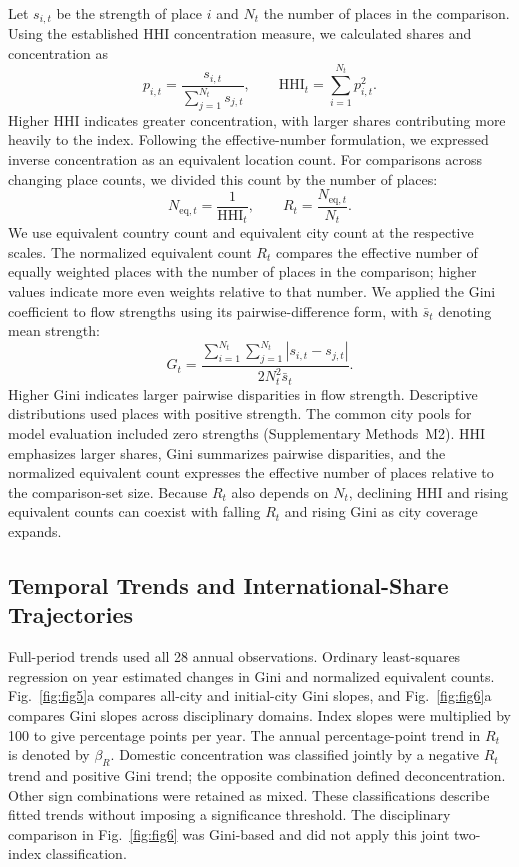 Let $s_{i,t}$ be the strength of place $i$ and $N_t$ the number of places in the comparison. Using the established HHI concentration measure\cite{rhoades1993}, we calculated shares and concentration as
\begin{equation*}
p_{i,t}=\frac{s_{i,t}}{\sum_{j=1}^{N_t}s_{j,t}},\qquad
\mathrm{HHI}_t=\sum_{i=1}^{N_t}p_{i,t}^{2}.
\end{equation*}
Higher HHI indicates greater concentration, with larger shares contributing more heavily to the index. Following the effective-number formulation\cite{hill1973,ref043}, we expressed inverse concentration as an equivalent location count. For comparisons across changing place counts, we divided this count by the number of places:
\begin{equation*}
N_{\mathrm{eq},t}=\frac{1}{\mathrm{HHI}_t},\qquad
R_t=\frac{N_{\mathrm{eq},t}}{N_t}.
\end{equation*}
We use equivalent country count and equivalent city count at the respective scales. The normalized equivalent count $R_t$ compares the effective number of equally weighted places with the number of places in the comparison; higher values indicate more even weights relative to that number. We applied the Gini coefficient\cite{gini1921} to flow strengths using its pairwise-difference form, with $\bar{s}_t$ denoting mean strength:
\begin{equation*}
G_t=\frac{\sum_{i=1}^{N_t}\sum_{j=1}^{N_t}|s_{i,t}-s_{j,t}|}
{2N_t^{2}\bar{s}_t}.
\end{equation*}
Higher Gini indicates larger pairwise disparities in flow strength. Descriptive distributions used places with positive strength. The common city pools for model evaluation included zero strengths (Supplementary Methods~M2). HHI emphasizes larger shares, Gini summarizes pairwise disparities, and the normalized equivalent count expresses the effective number of places relative to the comparison-set size. Because $R_t$ also depends on $N_t$, declining HHI and rising equivalent counts can coexist with falling $R_t$ and rising Gini as city coverage expands.

\subsection{Temporal Trends and International-Share Trajectories}

Full-period trends used all 28 annual observations. Ordinary least-squares regression on year estimated changes in Gini and normalized equivalent counts. Fig.~\ref{fig:fig5}a compares all-city and initial-city Gini slopes, and Fig.~\ref{fig:fig6}a compares Gini slopes across disciplinary domains. Index slopes were multiplied by 100 to give percentage points per year. The annual percentage-point trend in $R_t$ is denoted by $\beta_R$. Domestic concentration was classified jointly by a negative $R_t$ trend and positive Gini trend; the opposite combination defined deconcentration. Other sign combinations were retained as mixed. These classifications describe fitted trends without imposing a significance threshold. The disciplinary comparison in Fig.~\ref{fig:fig6} was Gini-based and did not apply this joint two-index classification.

